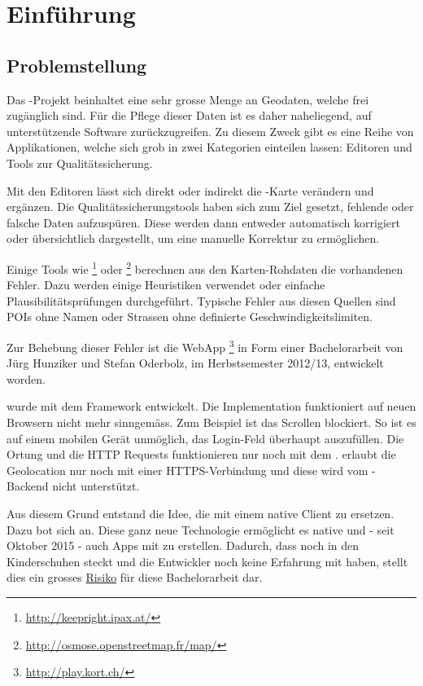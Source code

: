 \chapter{Einführung}
\label{tb-einfuehrung}

\section{Problemstellung}
Das -Projekt beinhaltet eine sehr grosse Menge an Geodaten, welche frei zugänglich sind.
Für die Pflege dieser Daten ist es daher naheliegend, auf unterstützende Software zurückzugreifen.
Zu diesem Zweck gibt es eine Reihe von Applikationen, welche sich grob in zwei Kategorien einteilen lassen:
Editoren und Tools zur Qualitätssicherung.

Mit den Editoren lässt sich direkt oder indirekt die -Karte verändern und ergänzen.
Die Qualitätssicherungstools haben sich zum Ziel gesetzt, fehlende oder falsche Daten aufzuspüren.
Diese werden dann entweder automatisch korrigiert oder übersichtlich dargestellt, um eine manuelle Korrektur zu ermöglichen.

Einige Tools wie \footnote{\url{http://keepright.ipax.at/}} oder \footnote{\url{http://osmose.openstreetmap.fr/map/}} berechnen aus den Karten-Rohdaten die vorhandenen Fehler.
Dazu werden einige Heuristiken verwendet oder einfache Plausibilitätsprüfungen durchgeführt.
Typische Fehler aus diesen Quellen sind \glspl{POI} ohne Namen oder Strassen ohne definierte Geschwindigkeitslimiten.

Zur Behebung dieser Fehler ist die \gls{WebApp} \kort{}\footnote{\url{http://play.kort.ch/}} in Form einer Bachelorarbeit von Jürg Hunziker und Stefan Oderbolz, im Herbstsemester 2012/13, entwickelt  worden.

\kort{} wurde mit dem  \gls{Framework} entwickelt.
Die Implementation funktioniert auf neuen Browsern nicht mehr sinngemäss.
Zum Beispiel ist das Scrollen blockiert.
So ist es auf einem mobilen Gerät unmöglich, das Login-Feld überhaupt auszufüllen.
Die Ortung und die HTTP Requests funktionieren nur noch mit dem .
 erlaubt die Geolocation nur noch mit einer HTTPS-Verbindung und diese wird vom \kort{}-Backend nicht unterstützt.

Aus diesem Grund entstand die Idee, die \kort{} mit einem native Client zu ersetzen.
Dazu bot sich  an. 
Diese ganz neue Technologie ermöglicht es native  und - seit Oktober 2015 - auch  Apps mit  zu erstellen. 
Dadurch, dass  noch in den Kinderschuhen steckt und die Entwickler noch keine Erfahrung mit  haben, stellt dies ein grosses \hyperref[pm-projektmanagement-risikomanagement]{Risiko} für diese Bachelorarbeit dar.

